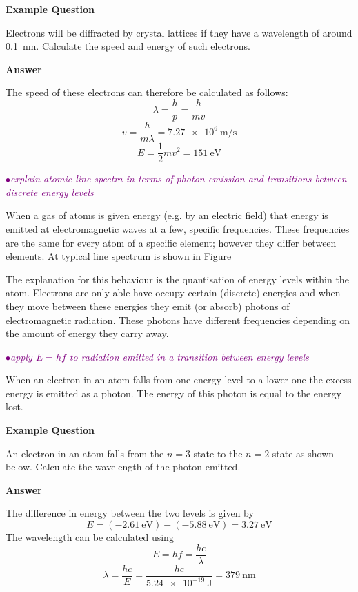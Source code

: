 \documentclass[a4paper,11pt,twoside]{memoir}
\newcounter{spec}[chapter]
\newcommand{\spec}[1]{\Needspace{5\baselineskip}\textcolor{purple}{$\bullet$\hspace{0.5cm}\textit{#1}}}
\newcommand{\answer}{\par \textbf{Answer} \par}
\newenvironment{example}
{\begin{lrbox}{\examplebox}\begin{minipage}{0.9\textwidth}\textbf{Example Question}\par}
{\end{minipage}\end{lrbox}\fbox{\usebox{\examplebox}}}
\begin{document}
\begin{example}
Electrons will be diffracted by crystal lattices if they have a wavelength of around \SI{0.1}{\nano\metre}. Calculate the speed and energy of such electrons.

\answer
The speed of these electrons can therefore be calculated as follows:
\[ \lambda = \frac{h}{p} = \frac{h}{mv} \]
\[ v = \frac{h}{m\lambda} = \SI{7.27e6}{\meter\per\second} \]
\[ E = \frac{1}{2}mv^2 = \SI{151}{\electronvolt} \]

\end{example}

\spec{explain atomic line spectra in terms of photon emission and transitions between discrete energy levels}

When a gas of atoms is given energy (e.g. by an electric field) that energy is emitted at electromagnetic waves at a few, specific frequencies. These frequencies are the same for every atom of a specific element; however they differ between elements. At typical line spectrum is shown in Figure %

The explanation for this behaviour is the quantisation of energy levels within the atom. Electrons are only able have occupy certain (discrete) energies and when they move between these energies they emit (or absorb) photons of electromagnetic radiation. These photons have different frequencies depending on the amount of energy they carry away.

\spec{apply $E = hf$ to radiation emitted in a transition between energy levels}

When an electron in an atom falls from one energy level to a lower one the excess energy is emitted as a photon. The energy of this photon is equal to the energy lost.

\begin{example}
  An electron in an atom falls from the $n=3$ state to the $n=2$ state as shown below. Calculate the wavelength of the photon emitted.
  \begin{center}
  \end{center}

  \answer
  The difference in energy between the two levels is given by
  \[ E = \left(\SI{-2.61}{\electronvolt}\right) - \left(\SI{-5.88}{\electronvolt}\right) = \SI{3.27}{\electronvolt} \]
  The wavelength can be calculated using
  \[ E = hf = \frac{hc}{\lambda} \]
  \[ \lambda = \frac{hc}{E} = \frac{hc}{\SI{5.24e-19}{\joule}} = \SI{379}{\nano\meter} \]
\end{example}
\end{document}
